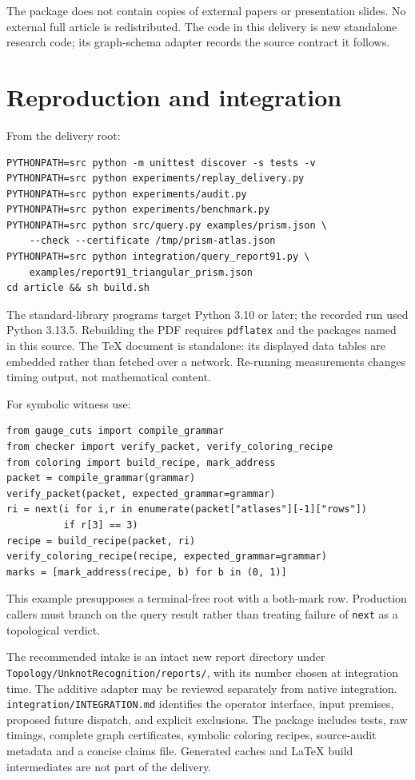 \documentclass[11pt,letterpaper]{article}
\theoremstyle{definition}
\theoremstyle{remark}\newtheorem{remark}[theorem]{Remark}
\DeclareRobustCommand{\code}[1]{\nolinkurl{#1}}
\begin{document}
The package does not contain copies of external papers or presentation slides. No external full article is redistributed. The code in this delivery is new standalone research code; its graph-schema adapter records the source contract it follows.

\section{Reproduction and integration}
From the delivery root:
\begin{lstlisting}
PYTHONPATH=src python -m unittest discover -s tests -v
PYTHONPATH=src python experiments/replay_delivery.py
PYTHONPATH=src python experiments/audit.py
PYTHONPATH=src python experiments/benchmark.py
PYTHONPATH=src python src/query.py examples/prism.json \
    --check --certificate /tmp/prism-atlas.json
PYTHONPATH=src python integration/query_report91.py \
    examples/report91_triangular_prism.json
cd article && sh build.sh
\end{lstlisting}
The standard-library programs target Python 3.10 or later; the recorded run used Python 3.13.5. Rebuilding the PDF requires \code{pdflatex} and the packages named in this source. The TeX document is standalone: its displayed data tables are embedded rather than fetched over a network. Re-running measurements changes timing output, not mathematical content.

\noindent\begin{minipage}{\linewidth}
For symbolic witness use:
\begin{lstlisting}
from gauge_cuts import compile_grammar
from checker import verify_packet, verify_coloring_recipe
from coloring import build_recipe, mark_address
packet = compile_grammar(grammar)
verify_packet(packet, expected_grammar=grammar)
ri = next(i for i,r in enumerate(packet["atlases"][-1]["rows"])
          if r[3] == 3)
recipe = build_recipe(packet, ri)
verify_coloring_recipe(recipe, expected_grammar=grammar)
marks = [mark_address(recipe, b) for b in (0, 1)]
\end{lstlisting}
\end{minipage}
This example presupposes a terminal-free root with a both-mark row. Production callers must branch on the query result rather than treating failure of \code{next} as a topological verdict.

The recommended intake is an intact new report directory under \code{Topology/UnknotRecognition/reports/}, with its number chosen at integration time. The additive adapter may be reviewed separately from native integration. \code{integration/INTEGRATION.md} identifies the operator interface, input premises, proposed future dispatch, and explicit exclusions. The package includes tests, raw timings, complete graph certificates, symbolic coloring recipes, source-audit metadata and a concise claims file. Generated caches and LaTeX build intermediates are not part of the delivery.
\end{document}

